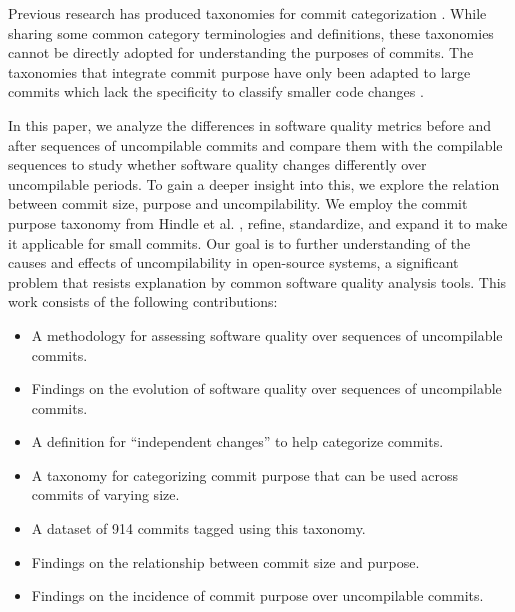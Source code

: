 Previous research has produced taxonomies for commit categorization \cite{Hindle_cate,Alali,Dragan,Swanson, Mauczka, Hindle_auto}. While sharing some common category terminologies and definitions, these taxonomies cannot be directly adopted for understanding the purposes of commits.
The taxonomies that integrate commit purpose have only been adapted to large commits \cite{Hindle_cate,Hindle_auto} which lack the specificity to classify smaller code changes \cite{Swanson}.

In this paper, we analyze the differences in software quality metrics before and after sequences of uncompilable commits and compare them with the compilable sequences to study whether software quality changes differently over uncompilable periods. To gain a deeper insight into this, we explore the relation between commit size, purpose and uncompilability.
We employ the commit purpose taxonomy from Hindle et al. \cite{Hindle_cate}, refine, standardize, and expand it to make it applicable for small commits. 
Our goal is to further understanding of the causes and effects of uncompilability in open-source systems, a significant problem that resists explanation by common software quality analysis tools. This work consists of the following contributions: 
\begin{itemize}
    \item A methodology for assessing software quality over sequences of uncompilable commits.
    \item Findings on the evolution of software quality over sequences of uncompilable commits.
    \item A definition for ``independent changes'' to help categorize commits.
    \item A taxonomy for categorizing commit purpose that can be used across commits of varying size.
    \item A dataset of 914 commits tagged using this taxonomy.
    \item Findings on the relationship between commit size and purpose.
    \item Findings on the incidence of commit purpose over uncompilable commits.  
\end{itemize}

